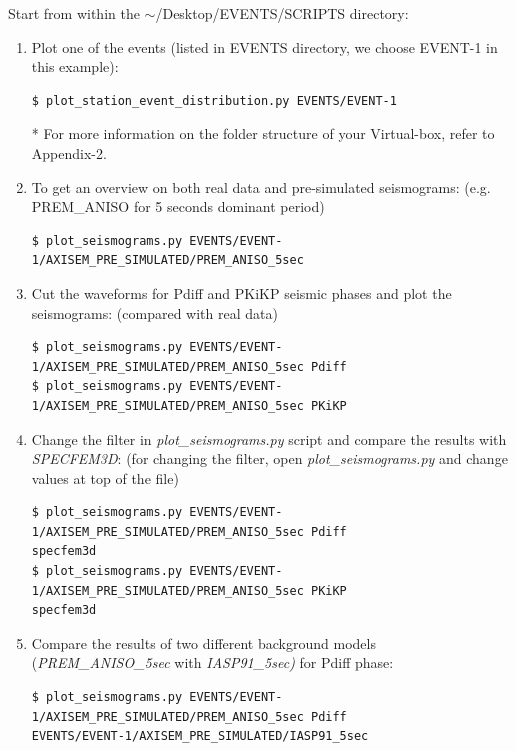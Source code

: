 \documentclass{article}
\begin{document}
Start from within the $\sim$/Desktop/EVENTS/SCRIPTS directory:

\begin{enumerate}
\item Plot one of the events (listed in EVENTS directory, we choose EVENT-1 in this example):

\begin{verbatim}
$ plot_station_event_distribution.py EVENTS/EVENT-1
\end{verbatim}
* For more information on the folder structure of your Virtual-box, refer to Appendix-2.

\item To get an overview on both real data and pre-simulated seismograms: (e.g. PREM\_ANISO 
for 5 seconds dominant period)
\begin{verbatim}
$ plot_seismograms.py EVENTS/EVENT-1/AXISEM_PRE_SIMULATED/PREM_ANISO_5sec
\end{verbatim}

\item Cut the waveforms for Pdiff and PKiKP seismic phases and plot the seismograms: 
(compared with real data)
\begin{verbatim}
$ plot_seismograms.py EVENTS/EVENT-1/AXISEM_PRE_SIMULATED/PREM_ANISO_5sec Pdiff
$ plot_seismograms.py EVENTS/EVENT-1/AXISEM_PRE_SIMULATED/PREM_ANISO_5sec PKiKP
\end{verbatim}

\item Change the filter in \textit{plot\_seismograms.py} script and compare the results with 
\textit{SPECFEM3D}: (for changing the filter, open \textit{plot\_seismograms.py} and change 
values at top of the file)

\begin{verbatim}
$ plot_seismograms.py EVENTS/EVENT-1/AXISEM_PRE_SIMULATED/PREM_ANISO_5sec Pdiff 
specfem3d
$ plot_seismograms.py EVENTS/EVENT-1/AXISEM_PRE_SIMULATED/PREM_ANISO_5sec PKiKP 
specfem3d
\end{verbatim}

\item Compare the results of two different background models (\textit{PREM\_ANISO\_5sec} with 
\textit{IASP91\_5sec)} for Pdiff phase:

\begin{verbatim}
$ plot_seismograms.py EVENTS/EVENT-1/AXISEM_PRE_SIMULATED/PREM_ANISO_5sec Pdiff 
EVENTS/EVENT-1/AXISEM_PRE_SIMULATED/IASP91_5sec
\end{verbatim}


\end{enumerate}
\end{document}
